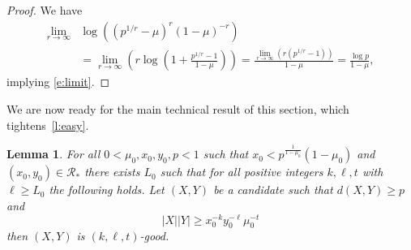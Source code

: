 \documentclass[reqno,final,12pt]{amsart}
\newtheorem{lem}[thm]{Lemma}
\newcommand{\mc}[1]{\mathcal{#1}}
\newcommand{\s}[1]{\left(#1\right)}
\begin{document}
\begin{proof}
	We have
	\begin{align*} \lim_{r \to \infty}&\log\s{(p^{1/r}-\mu)^r(1-\mu)^{-r}} \\&=\lim_{r \to \infty} \s{r \log\s{1+\frac{p^{1/r}-1}{1-\mu}}} =\frac{\lim_{r \to \infty} \s{r(p^{1/r}-1)}}{1-\mu}=\frac{\log p}{1-\mu},
	\end{align*}
	implying \eqref{e:limit}.
\end{proof}	

We are now ready for the main technical result of this section, which tightens~\cref{l:easy}.

\begin{lem}\label{t:bookmain}  For all $0< \mu_0,x_0,y_0,p <1$ such that $x_0 < p^{\frac{1}{1-\mu_0}}(1-\mu_0)$ and $(x_0,y_0) \in \mc{R_*}$ there exists $L_0$ such that for all positive integers $k,\ell,t$ with $\ell \geq L_0$  the following holds.
			Let $(X,Y)$ be a candidate such that $d(X,Y) \geq p$ and  \begin{equation}\label{e:bookmain} |X||Y| \geq x_0^{-k}y_0^{-\ell}\mu_0^{-t }\end{equation} 
			then $(X,Y)$ is $(k,\ell,t)$-good.
\end{lem}
\end{document}
